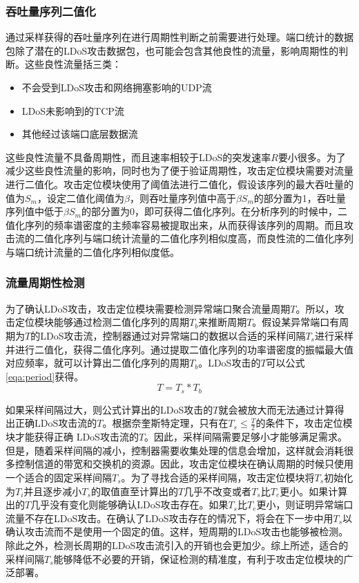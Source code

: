 \subsubsection{吞吐量序列二值化}
\label{chap4:binarization}
通过采样获得的吞吐量序列在进行周期性判断之前需要进行处理。端口统计的数据包除了潜在的LDoS攻击数据包，也可能会包含其他良性的流量，影响周期性的判断。这些良性流量括三类：
\begin{itemize}
	\item 不会受到LDoS攻击和网络拥塞影响的UDP流
	\item LDoS未影响到的TCP流
	\item 其他经过该端口底层数据流
\end{itemize}
这些良性流量不具备周期性，而且速率相较于LDoS的突发速率$R$要小很多。为了减少这些良性流量的影响，同时也为了便于验证周期性，攻击定位模块需要对流量进行二值化。攻击定位模块使用了阈值法进行二值化，假设该序列的最大吞吐量的值为$S_m$，设定二值化阈值为$\beta$，则吞吐量序列值中高于$\beta S_m$的部分置为1，吞吐量序列值中低于$\beta S_m$的部分置为0，即可获得二值化序列。在分析序列的时候中，二值化序列的频率谱密度的主频率容易被提取出来，从而获得该序列的周期。而且攻击流的二值化序列与端口统计流量的二值化序列相似度高，而良性流的二值化序列与端口统计流量的二值化序列相似度低。

\subsubsection{流量周期性检测}
为了确认LDoS攻击，攻击定位模块需要检测异常端口聚合流量周期$T$。所以，攻击定位模块能够通过检测二值化序列的周期$T_b$来推断周期$T$。假设某异常端口有周期为$T$的LDoS攻击流，控制器通过对异常端口的数据以合适的采样间隔$T_s$进行采样并进行二值化，获得二值化序列。通过提取二值化序列的功率谱密度的振幅最大值对应频率，就可以计算出二值化序列的周期$T_b$。LDoS攻击的$T$可以公式\ref{eqa:period}获得。
\vspace{-0.15in}
\begin{equation}
	\label{eqa:period}
	T = T_s * T_b
\end{equation}

如果采样间隔过大，则公式计算出的LDoS攻击的$T$就会被放大而无法通过计算得出正确LDoS攻击流的$T$。根据奈奎斯特定理，只有在$T_s \le \frac{T}{2}$的条件下，攻击定位模块才能获得正确 LDoS攻击流的$T$。因此，采样间隔需要足够小才能够满足需求。但是，随着采样间隔的减小，控制器需要收集处理的信息会增加，这样就会消耗很多控制信道的带宽和交换机的资源。因此，攻击定位模块在确认周期的时候只使用一个适合的固定采样间隔$T_s$。为了寻找合适的采样间隔，攻击定位模块将$T_s$初始化为$T_i$并且逐步减小$T_s$的取值直至计算出的$T$几乎不改变或者$T_s$比$T_e$更小。如果计算出的$T$几乎没有变化则能够确认LDoS攻击存在。如果$T_s$比$T_e$更小，则证明异常端口流量不存在LDoS攻击。在确认了LDoS攻击存在的情况下，将会在下一步中用$T_s$以确认攻击流而不是使用一个固定的值。这样，短周期的LDoS攻击也能够被检测。除此之外，检测长周期的LDoS攻击流引入的开销也会更加少。综上所述，适合的采样间隔$T_s$能够降低不必要的开销，保证检测的精准度，有利于攻击定位模块的广泛部署。

